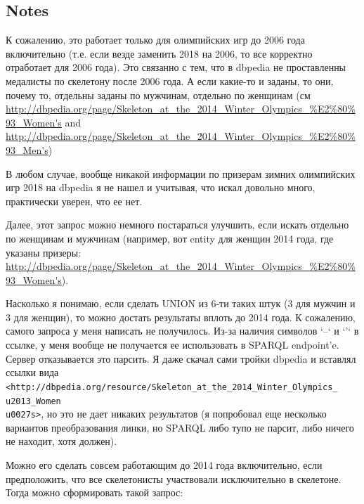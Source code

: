 \documentclass{article}
\begin{document}
\subsection*{Notes}

К сожалению, это работает только для олимпийских игр до 2006 года включительно (т.е. если везде заменить 2018 на 2006, то все корректно
отработает для 2006 года). Это связанно с тем, что в dbpedia не проставленны медалисты по скелетону после 2006 года.
А если какие-то и заданы, то они, почему то, отдельны заданы по мужчинам, отдельно по женщинам (см \url{http://dbpedia.org/page/Skeleton\_at\_the\_2014\_Winter\_Olympics\_\%E2\%80\%93\_Women's} and \url{http://dbpedia.org/page/Skeleton\_at\_the\_2014\_Winter\_Olympics\_\%E2\%80\%93\_Men's}) 

В любом случае, вообще никакой информации по призерам зимних олимпийских игр 2018 на dbpedia я не нашел и учитывая, что
искал довольно много, практически уверен, что ее нет.

Далее, этот запрос можно немного постараться улучшить, если искать отдельно по женщинам и мужчинам (например, вот entity для
женщин 2014 года, где указаны призеры: \url{http://dbpedia.org/page/Skeleton\_at\_the\_2014\_Winter\_Olympics\_\%E2\%80\%93\_Women's}).

Насколько я понимаю, если сделать UNION из 6-ти таких штук (3 для мужчин и 3 для женщин), то можно достать результаты вплоть
до 2014 года. К сожалению, самого запроса у меня написать не получилось. Из-за наличия символов `–` и `'` в ссылке,
у меня вообще не получается ее использовать в SPARQL endpoint'e. Сервер отказывается это парсить. Я даже скачал сами
тройки dbpedia и вставлял ссылки вида \\ \texttt{<http://dbpedia.org/resource/Skeleton\_at\_the\_2014\_Winter\_Olympics\_\\u2013\_Women\\u0027s>}, но это не дает никаких результатов (я попробовал еще 
несколько вариантов преобразования линки, но SPARQL либо тупо не парсит, либо ничего не находит, хотя должен).

Можно его сделать совсем работающим до 2014 года включительно, если предположить, что все скелетонисты участвовали
исключительно в скелетоне. Тогда можно сформировать такой запрос:
\end{document}
